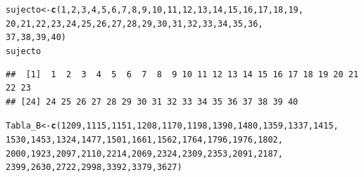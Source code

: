 \documentclass[12pt,letterpaper]{article}\usepackage[]{graphicx}\usepackage[]{color}
\makeatletter
\newcommand{\hlnum}[1]{\textcolor[rgb]{0.686,0.059,0.569}{#1}}%
\newcommand{\hlstd}[1]{\textcolor[rgb]{0.345,0.345,0.345}{#1}}%
\newcommand{\hlkwb}[1]{\textcolor[rgb]{0.69,0.353,0.396}{#1}}%
\newcommand{\hlkwd}[1]{\textcolor[rgb]{0.737,0.353,0.396}{\textbf{#1}}}%
\newenvironment{kframe}{%
 \def\at@end@of@kframe{}%
 \ifinner\ifhmode%
  \def\at@end@of@kframe{\end{minipage}}%
  \begin{minipage}{\columnwidth}%
 \fi\fi%
 \def\FrameCommand##1{\hskip\@totalleftmargin \hskip-\fboxsep
 \colorbox{shadecolor}{##1}\hskip-\fboxsep
     \hskip-\linewidth \hskip-\@totalleftmargin \hskip\columnwidth}%
 \MakeFramed {\advance\hsize-\width
   \@totalleftmargin\z@ \linewidth\hsize
   \@setminipage}}%
 {\par\unskip\endMakeFramed%
 \at@end@of@kframe}
\newenvironment{knitrout}{}{} %
\makeatother
\begin{document}
\begin{knitrout}
\color{fgcolor}\begin{kframe}
\begin{alltt}
\hlstd{sujecto} \hlkwb{<-} \hlkwd{c}\hlstd{(}\hlnum{1}\hlstd{,} \hlnum{2}\hlstd{,} \hlnum{3}\hlstd{,} \hlnum{4}\hlstd{,} \hlnum{5}\hlstd{,} \hlnum{6}\hlstd{,} \hlnum{7}\hlstd{,} \hlnum{8}\hlstd{,} \hlnum{9}\hlstd{,} \hlnum{10}\hlstd{,} \hlnum{11}\hlstd{,} \hlnum{12}\hlstd{,} \hlnum{13}\hlstd{,} \hlnum{14}\hlstd{,} \hlnum{15}\hlstd{,} \hlnum{16}\hlstd{,} \hlnum{17}\hlstd{,} \hlnum{18}\hlstd{,} \hlnum{19}\hlstd{,}
             \hlnum{20}\hlstd{,} \hlnum{21}\hlstd{,} \hlnum{22}\hlstd{,} \hlnum{23}\hlstd{,} \hlnum{24}\hlstd{,} \hlnum{25}\hlstd{,} \hlnum{26}\hlstd{,} \hlnum{27}\hlstd{,} \hlnum{28}\hlstd{,} \hlnum{29}\hlstd{,} \hlnum{30}\hlstd{,} \hlnum{31}\hlstd{,} \hlnum{32}\hlstd{,} \hlnum{33}\hlstd{,} \hlnum{34}\hlstd{,} \hlnum{35}\hlstd{,} \hlnum{36}\hlstd{,}
             \hlnum{37}\hlstd{,} \hlnum{38}\hlstd{,} \hlnum{39}\hlstd{,} \hlnum{40}\hlstd{)}
\hlstd{sujecto}
\end{alltt}
\begin{verbatim}
##  [1]  1  2  3  4  5  6  7  8  9 10 11 12 13 14 15 16 17 18 19 20 21 22 23
## [24] 24 25 26 27 28 29 30 31 32 33 34 35 36 37 38 39 40
\end{verbatim}
\begin{alltt}
\hlstd{Tabla_B}\hlkwb{<-} \hlkwd{c}\hlstd{(}\hlnum{1209}\hlstd{,} \hlnum{1115}\hlstd{,} \hlnum{1151}\hlstd{,} \hlnum{1208}\hlstd{,} \hlnum{1170}\hlstd{,} \hlnum{1198}\hlstd{,} \hlnum{1390}\hlstd{,} \hlnum{1480}\hlstd{,} \hlnum{1359}\hlstd{,} \hlnum{1337}\hlstd{,} \hlnum{1415}\hlstd{,}
            \hlnum{1530}\hlstd{,} \hlnum{1453}\hlstd{,} \hlnum{1324}\hlstd{,} \hlnum{1477}\hlstd{,} \hlnum{1501}\hlstd{,} \hlnum{1661}\hlstd{,} \hlnum{1562}\hlstd{,} \hlnum{1764}\hlstd{,} \hlnum{1796}\hlstd{,} \hlnum{1976}\hlstd{,} \hlnum{1802}\hlstd{,}
            \hlnum{2000}\hlstd{,} \hlnum{1923}\hlstd{,} \hlnum{2097}\hlstd{,} \hlnum{2110}\hlstd{,} \hlnum{2214}\hlstd{,} \hlnum{2069}\hlstd{,} \hlnum{2324}\hlstd{,} \hlnum{2309}\hlstd{,} \hlnum{2353}\hlstd{,} \hlnum{2091}\hlstd{,} \hlnum{2187}\hlstd{,}
            \hlnum{2399}\hlstd{,} \hlnum{2630}\hlstd{,} \hlnum{2722}\hlstd{,} \hlnum{2998}\hlstd{,} \hlnum{3392}\hlstd{,} \hlnum{3379}\hlstd{,} \hlnum{3627}\hlstd{)}


\end{alltt}
\end{kframe}
\end{knitrout}
\end{document}
